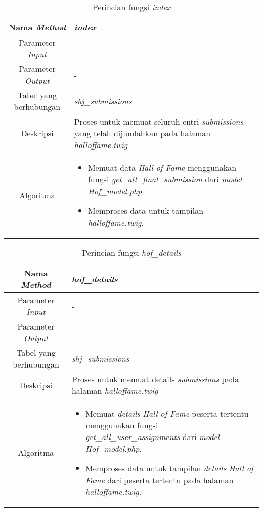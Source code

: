 \begin{enumerate}
	\begin{table}[H]
		\caption{Perincian fungsi \textit{index}}
		\begin{tabular}{|c|p{11cm}|}
			\hline
			Nama \textit{Method} 	& 	\textit{index} 	\\
			\hline
			Parameter \textit{Input} & - \\
			\hline
			Parameter \textit{Output} &  - \\
			\hline
			Tabel yang berhubungan & \textit{shj\_submissions} \\
			\hline
			Deskripsi	& Proses untuk memuat seluruh entri \textit{submissions} yang telah dijumlahkan pada halaman \textit{halloffame.twig}	 \\
			\hline
			Algoritma	& \begin{itemize}
				\item Memuat data \textit{Hall of Fame} menggunakan fungsi \textit{get\_all\_final\_submission} dari \textit{model Hof\_model.php}.
				\item Memproses data untuk tampilan \textit{halloffame.twig}.
			\end{itemize} \\
			\hline
		\end{tabular}
	\end{table}
	
	\begin{table}[H]
		\caption{Perincian fungsi \textit{hof\_details}}
		\begin{tabular}{|c|p{11cm}|}
			\hline
			Nama \textit{Method} 	& 	\textit{hof\_details} 	\\
			\hline
			Parameter \textit{Input} & - \\
			\hline
			Parameter \textit{Output} &  - \\
			\hline
			Tabel yang berhubungan & \textit{shj\_submissions} \\
			\hline
			Deskripsi	& Proses untuk memuat details \textit{submissions} pada halaman \textit{halloffame.twig}	 \\
			\hline
			Algoritma	& \begin{itemize}
				\item Memuat \textit{details} \textit{Hall of Fame} peserta tertentu menggunakan fungsi \textit{get\_all\_user\_assignments} dari \textit{model Hof\_model.php}.
				\item Memproses data untuk tampilan \textit{details} \textit{Hall of Fame} dari peserta tertentu pada halaman \textit{halloffame.twig}.
			\end{itemize} \\
			\hline
		\end{tabular}
	\end{table}
\end{enumerate}

